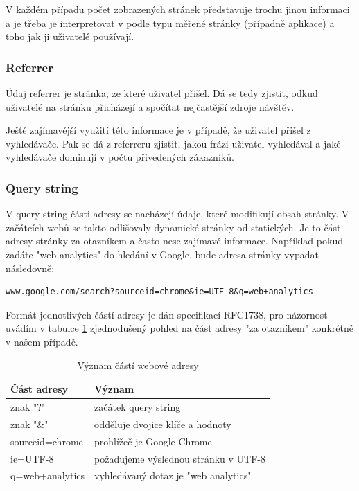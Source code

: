 \documentclass[bc,male,java,dept456]{diploma}						%
\begin{document}
V každém případu počet zobrazených stránek představuje trochu jinou informaci a je třeba je interpretovat v podle typu měřené stránky (případně aplikace) a toho jak ji uživatelé používají.

\subsubsection{Referrer}

Údaj referrer je stránka, ze které uživatel přišel. Dá se tedy zjistit, odkud uživatelé na stránku přicházejí a spočítat nejčastější zdroje návštěv.

Ještě zajímavější využití této informace je v případě, že uživatel přišel z vyhledávače. Pak se dá z referreru zjistit, jakou frázi uživatel vyhledával a jaké vyhledávače dominují v počtu přivedených zákazníků.

\subsubsection{Query string}

V query string části adresy se nacházejí údaje, které modifikují obsah stránky. V začátcích webů se takto odlišovaly dynamické stránky od statických. Je to část adresy stránky za otazníkem a často nese zajímavé informace. Například pokud zadáte "web analytics" do hledání v Google, bude adresa stránky vypadat následovně:

\begin{lstlisting}[label=src:Plain,caption=Adresa ve vyhledávači pro dotaz web analytics, label=lala]
www.google.com/search?sourceid=chrome&ie=UTF-8&q=web+analytics
\end{lstlisting}

Formát jednotlivých částí adresy je dán specifikací RFC1738\cite{url}, pro názornost uvádím v tabulce \ref{table:web_address_meaning} zjednodušený pohled na část adresy "za otazníkem" konkrétně v našem pří\-pa\-dě.

\begin{table}
	\centering
	\begin{tabular}{ll}
	Část adresy & Význam \\	\hline \smallskip
	znak "?" & začátek query string \\ \smallskip
	znak "\&" & odděluje dvojice klíče a hodnoty \\ \smallskip
	sourceid=chrome & prohlížeč je Google Chrome \\ \smallskip
	ie=UTF-8 & požadujeme výslednou stránku v UTF-8 \\ \smallskip
	q=web+analytics & vyhledávaný dotaz je "web analytics"
\end{tabular}
	\caption{Význam částí webové adresy}	
	\label{table:web_address_meaning}	
\end{table}
\end{document}
